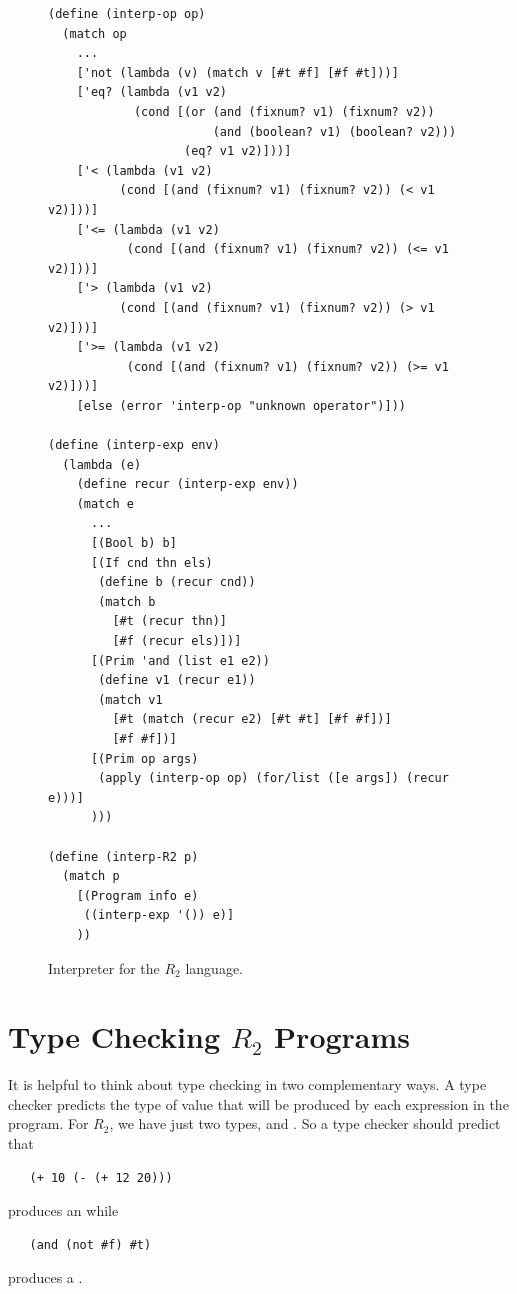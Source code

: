 \documentclass[11pt]{book}
\begin{document}
\begin{figure}[tbp]
\begin{lstlisting}
(define (interp-op op)
  (match op
    ...
    ['not (lambda (v) (match v [#t #f] [#f #t]))]
    ['eq? (lambda (v1 v2)
            (cond [(or (and (fixnum? v1) (fixnum? v2))
                       (and (boolean? v1) (boolean? v2)))
                   (eq? v1 v2)]))]
    ['< (lambda (v1 v2)
          (cond [(and (fixnum? v1) (fixnum? v2)) (< v1 v2)]))]
    ['<= (lambda (v1 v2)
           (cond [(and (fixnum? v1) (fixnum? v2)) (<= v1 v2)]))]
    ['> (lambda (v1 v2)
          (cond [(and (fixnum? v1) (fixnum? v2)) (> v1 v2)]))]
    ['>= (lambda (v1 v2)
           (cond [(and (fixnum? v1) (fixnum? v2)) (>= v1 v2)]))]
    [else (error 'interp-op "unknown operator")]))

(define (interp-exp env)
  (lambda (e)
    (define recur (interp-exp env))
    (match e
      ...
      [(Bool b) b]
      [(If cnd thn els)
       (define b (recur cnd))
       (match b
         [#t (recur thn)]
         [#f (recur els)])]
      [(Prim 'and (list e1 e2))
       (define v1 (recur e1))
       (match v1
         [#t (match (recur e2) [#t #t] [#f #f])]
         [#f #f])]
      [(Prim op args)
       (apply (interp-op op) (for/list ([e args]) (recur e)))]
      )))

(define (interp-R2 p)
  (match p
    [(Program info e)
     ((interp-exp '()) e)]
    ))
\end{lstlisting}
\caption{Interpreter for the $R_2$ language.}
\label{fig:interp-R2}
\end{figure}


\section{Type Checking $R_2$ Programs}
\label{sec:type-check-r2}

It is helpful to think about type checking in two complementary
ways. A type checker predicts the type of value that will be produced
by each expression in the program.  For $R_2$, we have just two types,
 and . So a type checker should predict that
\begin{lstlisting}
   (+ 10 (- (+ 12 20)))
\end{lstlisting}
produces an  while
\begin{lstlisting}
   (and (not #f) #t)
\end{lstlisting}
produces a .
\end{document}
